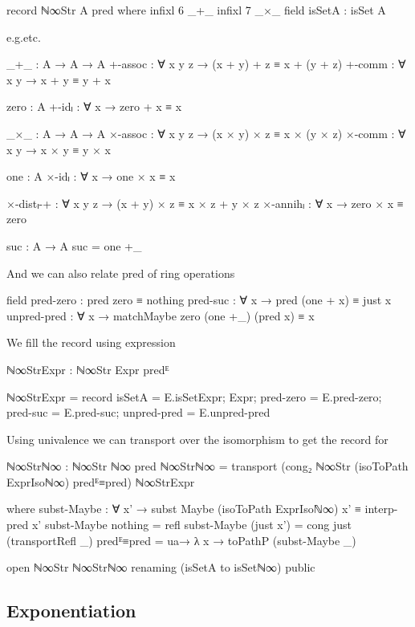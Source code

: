 \begin{code}[hide]
record ℕ∞Str A pred where
  infixl 6 _+_
  infixl 7 _×_
  field
    isSetA : isSet A
\end{code}
e.g.etc.
\begin{code}
    _+_      : A → A → A
    +-assoc  : ∀ x y z → (x + y) + z ≡ x + (y + z)
    +-comm   : ∀ x y → x + y ≡ y + x
\end{code}
\begin{code}[hide]
    zero : A
    +-idₗ : ∀ x → zero + x ≡ x

    _×_ : A → A → A
    ×-assoc : ∀ x y z → (x × y) × z ≡ x × (y × z)
    ×-comm : ∀ x y → x × y ≡ y × x

    one : A
    ×-idₗ : ∀ x → one × x ≡ x

    ×-distₗ-+ : ∀ x y z → (x + y) × z ≡ x × z + y × z
    ×-annihₗ : ∀ x → zero × x ≡ zero

  suc : A → A
  suc = one +_
\end{code}
And we can also relate pred of ring operations
\begin{code}
  field
    pred-zero    : pred zero ≡ nothing
    pred-suc     : ∀ x → pred (one + x) ≡ just x
    unpred-pred  : ∀ x → matchMaybe zero (one +_) (pred x) ≡ x
\end{code}
We fill the record using expression
\begin{code}
ℕ∞StrExpr : ℕ∞Str Expr predᴱ
\end{code}
\begin{code}[hide]
ℕ∞StrExpr =
  record
    { isSetA = E.isSetExpr;
      Expr;
      pred-zero = E.pred-zero;
      pred-suc = E.pred-suc;
      unpred-pred = E.unpred-pred }
\end{code}
Using univalence we can transport over the isomorphism to get the record for
\begin{code}
ℕ∞Strℕ∞ : ℕ∞Str ℕ∞ pred
ℕ∞Strℕ∞ =
  transport
    (cong₂ ℕ∞Str (isoToPath ExprIsoℕ∞) predᴱ≡pred)
    ℕ∞StrExpr
\end{code}
\begin{code}[hide]
  where
  subst-Maybe :
    ∀ x' → subst Maybe (isoToPath ExprIsoℕ∞) x' ≡ interp-pred x'
  subst-Maybe nothing = refl
  subst-Maybe (just x') = cong just (transportRefl _)
  predᴱ≡pred = ua→ λ x → toPathP (subst-Maybe _)

open ℕ∞Str ℕ∞Strℕ∞ renaming (isSetA to isSetℕ∞) public
\end{code}

\subsection{Exponentiation}

